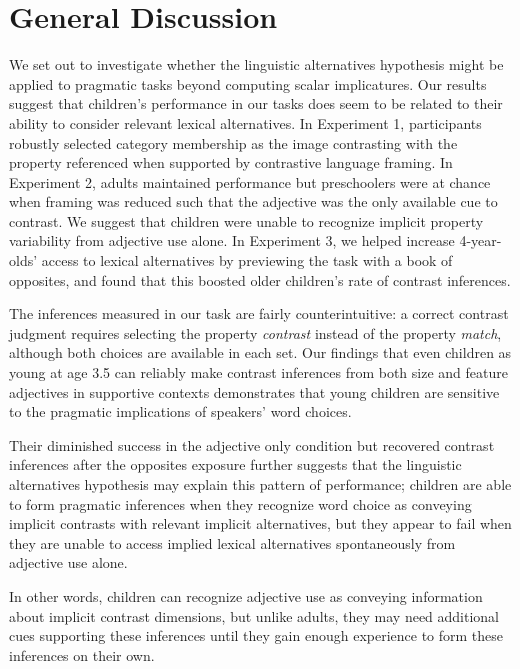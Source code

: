 \documentclass[10pt,letterpaper]{article}
\begin{document}

 \section{General Discussion} 

We set out to investigate whether the linguistic alternatives hypothesis might be applied to pragmatic tasks beyond computing scalar implicatures.  Our results suggest that children's performance in our tasks does seem to be related to their ability to consider relevant lexical alternatives.  In Experiment 1, participants robustly selected category membership as the image contrasting with the property referenced when supported by contrastive language framing.  In Experiment 2, adults maintained performance but preschoolers were at chance when framing was reduced such that the adjective was the only available cue to contrast.  We suggest that children were unable to recognize implicit property variability from adjective use alone.  In Experiment 3, we helped increase 4-year-olds' access to lexical alternatives by previewing the task with a book of opposites, and found that this boosted older children's rate of contrast inferences.  

The inferences measured in our task are fairly counterintuitive: a correct contrast judgment requires selecting the property \emph{contrast} instead of the property \emph{match}, although both choices are available in each set.  Our findings that even children as young at age 3.5 can reliably make contrast inferences from both size and feature adjectives in supportive contexts demonstrates that young children are sensitive to the pragmatic implications of speakers' word choices.  

Their diminished success in the adjective only condition but recovered contrast inferences after the opposites exposure further suggests that the linguistic alternatives hypothesis may explain this pattern of performance; children are able to form pragmatic inferences when they recognize word choice as conveying implicit contrasts with relevant implicit alternatives, but they appear to fail when they are unable to access implied lexical alternatives spontaneously from adjective use alone. 

 In other words, children can recognize adjective use as conveying information about implicit contrast dimensions, but unlike adults, they may need additional cues supporting these inferences until they gain enough experience to form these inferences on their own. 
\end{document}

